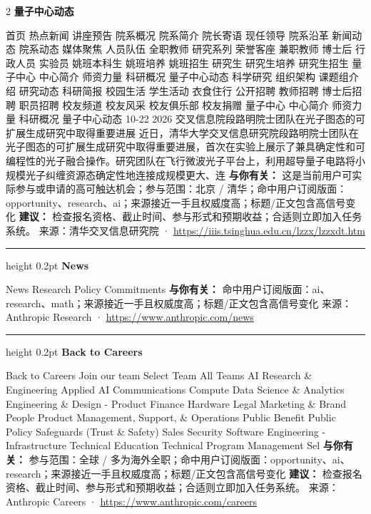 \documentclass[10.5pt]{ctexart}
\begin{document}
\begin{multicols}{2}
{\large\bfseries 量子中心动态}\par
首页 热点新闻 讲座预告 院系概况 院系简介 院长寄语 现任领导 院系沿革 新闻动态 院系动态 媒体聚焦 人员队伍 全职教师 研究系列 荣誉客座 兼职教师 博士后 行政人员 实验员 姚班本科生 姚班培养 姚班招生 研究生 研究生培养 研究生招生 量子中心 中心简介 师资力量 科研概况 量子中心动态 科学研究 组织架构 课题组介绍 研究动态 科研简报 校园生活 学生活动 衣食住行 公开招聘 教师招聘 博士后招聘 职员招聘 校友频道 校友风采 校友俱乐部 校友捐赠 量子中心 中心简介 师资力量 科研概况 量子中心动态 10-22 2026 交叉信息院段路明院士团队在光子图态的可扩展生成研究中取得重要进展 近日，清华大学交叉信息研究院段路明院士团队在光子图态的可扩展生成研究中取得重要进展，首次在实验上展示了兼具确定性和可编程性的光子融合操作。研究团队在飞行微波光子平台上，利用超导量子电路将小规模光子纠缠资源态确定性地连接成规模更大、连
\textbf{与你有关：} 这是当前用户可实际参与或申请的高可触达机会；参与范围：北京 / 清华；命中用户订阅版面：opportunity、research、ai；来源接近一手且权威度高；标题/正文包含高信号变化
\textbf{建议：} 检查报名资格、截止时间、参与形式和预期收益；合适则立即加入任务系统。
{\footnotesize\color{ormuted} 来源：清华交叉信息研究院 · \url{https://iiis.tsinghua.edu.cn/lzzx/lzzxdt.htm}}
\vspace{2mm}
\hrule height 0.2pt
\vspace{2mm}
{\large\bfseries News}\par
News Research Policy Commitments
\textbf{与你有关：} 命中用户订阅版面：ai、research、math；来源接近一手且权威度高；标题/正文包含高信号变化
{\footnotesize\color{ormuted} 来源：Anthropic Research · \url{https://www.anthropic.com/news}}
\vspace{2mm}
\hrule height 0.2pt
\vspace{2mm}
{\large\bfseries Back to Careers}\par
Back to Careers Join our team Select Team All Teams AI Research \& Engineering Applied AI Communications Compute Data Science \& Analytics Engineering \& Design - Product Finance Hardware Legal Marketing \& Brand People Product Management, Support, \& Operations Public Benefit Public Policy Safeguards (Trust \& Safety) Sales Security Software Engineering - Infrastructure Technical Education Technical Program Management Sel
\textbf{与你有关：} 参与范围：全球 / 多为海外全职；命中用户订阅版面：opportunity、ai、research；来源接近一手且权威度高；标题/正文包含高信号变化
\textbf{建议：} 检查报名资格、截止时间、参与形式和预期收益；合适则立即加入任务系统。
{\footnotesize\color{ormuted} 来源：Anthropic Careers · \url{https://www.anthropic.com/careers}}

\end{multicols}
\end{document}
